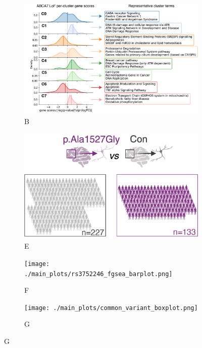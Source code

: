 \begin{figure}[H]
\begin{subfigure}[t]{0.47\textwidth}
    \end{subfigure}
    \begin{subfigure}[t]{0.45\textwidth}
        \caption{B}
        \includegraphics[width=\textwidth]{./main_plots/kl_densities.png}        
    \end{subfigure}
    \begin{subfigure}[t]{0.3\textwidth}
        \caption{E}
        \includegraphics[width=\textwidth]{./main_plots/common_var_cohort_cartoon.png}        
    \end{subfigure}
    \hspace{0.01\textwidth} %
    \begin{subfigure}[t]{0.225\textwidth}
        \caption{F}
        \texttt{[image: ./main\_plots/rs3752246\_fgsea\_barplot.png]}        
    \end{subfigure}
    \begin{subfigure}[t]{0.45\textwidth}
        \caption{G}
        \texttt{[image: ./main\_plots/common\_variant\_boxplot.png]}        

\end{subfigure}
\end{figure}

